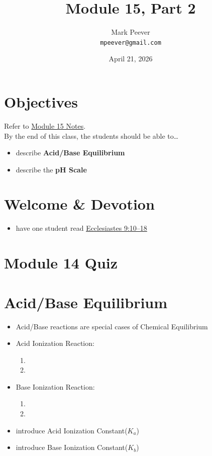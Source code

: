 \documentclass[10pt, oneside]{article}   	%
\title{Module 15, Part 2}
\author{Mark Peever\\ \texttt{mpeever@gmail.com}}
\date{April 21, 2026}
\begin{document}
\maketitle

\section*{Objectives}
Refer to \href{https://drive.google.com/file/d/1_Hv3SaslAcLJrZ5UijrZkMslhQ-wCpJq/view?usp=sharing}{Module 15 Notes}.\\

By the end of this class, the students should be able to\ldots
\begin{itemize}
\item describe \textbf{Acid/Base Equilibrium}
\item describe the \textbf{pH Scale}
\end{itemize}

\section*{Welcome \& Devotion}
\begin{itemize}
\item have one student read \href{https://www.biblegateway.com/passage/?search=Ecclesiastes\%209\%3A10–18\&version=LSB}{Ecclesiastes 9:10--18}
\end{itemize}

\section*{Module 14 Quiz}



\section*{Acid/Base Equilibrium}

\begin{itemize}
\item Acid/Base reactions are special cases of Chemical Equilibrium
\item Acid Ionization Reaction: 
\begin{enumerate}
\item {} 
\item {}
\end{enumerate}

\item Base Ionization Reaction:
\begin{enumerate}
\item {} 
\item {}
\end{enumerate}
 
\item introduce Acid Ionization Constant($K_{a}$) 
\item introduce Base Ionization Constant($K_{b}$) 
\end{itemize}
\end{document}
